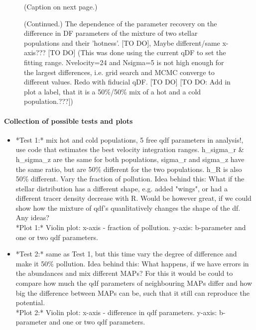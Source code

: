 \documentclass[12pt,preprint]{aastex}
\begin{document}

\begin{figure}
\caption{(Caption on next page.)}
\end{figure}


\addtocounter{figure}{-1}
\begin{figure} [t!]
  \caption{(Continued.) The dependence of the parameter recovery on the difference in DF parameters of the mixture of two stellar populations and their 'hotness'.  [TO DO], Maybe different/same x-axis??? [TO DO] (This was done using the current qDF to set the fitting range. Nvelocity=24 and Nsigma=5 is not high enough for the largest differences, i.e. grid search and MCMC converge to different values. Redo with fiducial qDF. [TO DO] [TO DO: Add in plot a label, that it is a 50\%/50\% mix of a hot and a cold population.???])} 
\end{figure}


\paragraph{Collection of possible tests and plots}

\begin{itemize}
\item *Test 1:* mix hot and cold populations, 5 free qdf parameters in analysis!, use code that estimates the best velocity integration ranges. h\_sigma\_r \& h\_sigma\_z are the same for both populations, sigma\_r and sigma\_z have the same ratio, but are 50\% different for the two populations. h\_R is also 50\% different. Vary the fraction of pollution. Idea behind this: What if the stellar distribution has a different shape, e.g. added "wings", or had a different tracer density decrease with R. Would be however great, if we could show how the mixture of qdf's quanlitatively changes the shape of the df. Any ideas? \\
*Plot 1:* Violin plot: x-axis - fraction of pollution. y-axis: b-parameter and one or two qdf parameters.
\item *Test 2:* same as Test 1, but this time vary the degree of difference and make it 50\% pollution. Idea behind this: What happens, if we have errors in the abundances and mix different MAPs? For this it would be could to compare how much the qdf parameters of neighbouring MAPs differ and how big the difference between MAPs can be, such that it still can reproduce the potential. \\
*Plot 2:* Violin plot: x-axis - difference in qdf parameters. y-axis: b-parameter and one or two qdf parameters.
\end{itemize}
\end{document}
